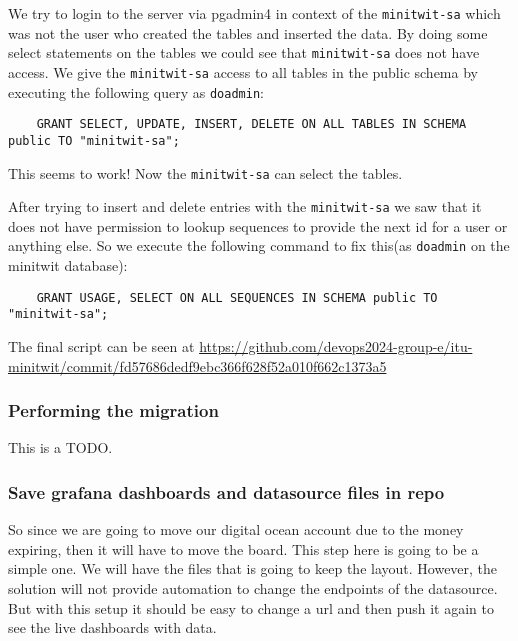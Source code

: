 We try to login to the server via pgadmin4 in context of the \texttt{minitwit-sa} which was not the user who created the tables and inserted the data. By doing some select statements on the tables we could see that \texttt{minitwit-sa} does not have access. We give the \texttt{minitwit-sa} access to all tables in the public schema by executing the following query as \texttt{doadmin}:

\begin{verbatim}
    GRANT SELECT, UPDATE, INSERT, DELETE ON ALL TABLES IN SCHEMA public TO "minitwit-sa";
\end{verbatim}

This seems to work! Now the \texttt{minitwit-sa} can select the tables.

After trying to insert and delete entries with the \texttt{minitwit-sa} we saw that it does not have permission to lookup sequences to provide the next id for a user or anything else. So we execute the following command to fix this(as \texttt{doadmin} on the minitwit database):

\begin{verbatim}
    GRANT USAGE, SELECT ON ALL SEQUENCES IN SCHEMA public TO "minitwit-sa";
\end{verbatim}

The final script can be seen at \url{https://github.com/devops2024-group-e/itu-minitwit/commit/fd57686dedf9ebc366f628f52a010f662c1373a5}

\subsubsection{Performing the migration}
\label{log:performing-the-migration}

This is a TODO.

\subsubsection{Save grafana dashboards and datasource files in repo}
\label{log:save-grafana-dashboards-and-datasource-files-in-repo}

So since we are going to move our digital ocean account due to the money expiring, then it will have to move the board. This step here is going to be a simple one. We will have the files that is going to keep the layout. However, the solution will not provide automation to change the endpoints of the datasource. But with this setup it should be easy to change a url and then push it again to see the live dashboards with data.

